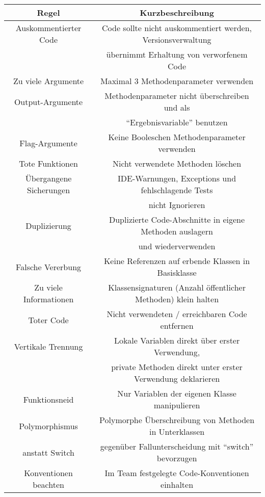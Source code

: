 \documentclass[da,ngerman]{stthesis}
\begin{document}
				\begin{center}
					\tabulinesep=1.5mm
					\begin{longtabu}{|c|c|}
						\hline
  						\textbf{Regel} & \textbf{Kurzbeschreibung}\\
  						\hline
  						Auskommentierter Code & Code sollte nicht auskommentiert werden, Versionsverwaltung \\ & übernimmt Erhaltung von verworfenem Code \\
  						\hline
  						Zu viele Argumente & Maximal 3 Methodenparameter verwenden\\
  						\hline
  						Output-Argumente & Methodenparameter nicht überschreiben und als \\ & "`Ergebnisvariable"' benutzen \\
  						\hline
  						Flag-Argumente & Keine Booleschen Methodenparameter verwenden \\
  						\hline
  						Tote Funktionen & Nicht verwendete Methoden löschen \\
  						\hline
  						Übergangene Sicherungen & IDE-Warnungen, Exceptions und fehlschlagende Tests \\ & nicht Ignorieren \\
  						\hline 
  						Duplizierung & Duplizierte Code-Abschnitte in eigene Methoden auslagern \\ & und wiederverwenden \\
  						\hline
  						Falsche Vererbung & Keine Referenzen auf erbende Klassen in Basisklasse \\
  						\hline
  						Zu viele Informationen & Klassensignaturen (Anzahl öffentlicher Methoden) klein halten \\
  						\hline
  						Toter Code & Nicht verwendeten / erreichbaren Code entfernen \\
  						\hline
  						Vertikale Trennung & Lokale Variablen direkt über erster Verwendung, \\ & private Methoden direkt unter erster Verwendung deklarieren \\
  						\hline
  						Funktionsneid & Nur Variablen der eigenen Klasse manipulieren \\
  						\hline
  						Polymorphismus & Polymorphe Überschreibung von Methoden in Unterklassen \\ anstatt Switch & gegenüber Fallunterscheidung mit "`switch"' bevorzugen \\
  						\hline
  						Konventionen beachten & Im Team festgelegte Code-Konventionen einhalten \\

\end{longtabu}
\end{center}
\end{document}
